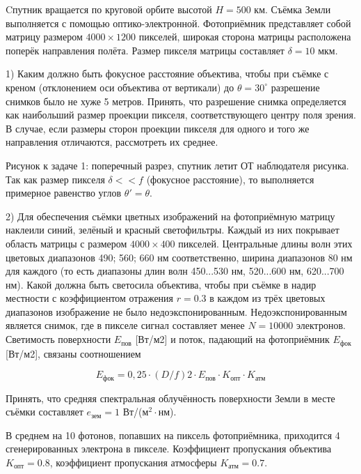 
Cпутник вращается по круговой орбите высотой $H=500$ км. Съёмка Земли выполняется с помощью оптико-электронной. 
Фотоприёмник представляет собой матрицу размером $4000 \times 1200$ пикселей, широкая сторона матрицы 
расположена поперёк направления полёта. Размер пикселя матрицы составляет $\delta=10$ мкм.

1) Каким должно быть фокусное расстояние объектива, чтобы при съёмке с креном (отклонением оси 
объектива от вертикали) до $\theta=30^{\circ}$ разрешение снимков было не хуже 5 метров. Принять, 
что разрешение снимка определяется как наибольший размер проекции пикселя, соответствующего центру поля зрения. 
В случае, если размеры сторон проекции пикселя для одного и того же направления отличаются, рассмотреть их среднее.


Рисунок к задаче 1: поперечный разрез, спутник летит ОТ наблюдателя рисунка. Так как размер пикселя 
$\delta << f$ (фокусное расстояние), то выполняется примерное равенство углов $\theta' = \theta$.

2) Для обеспечения съёмки цветных изображений на фотоприёмную матрицу наклеили синий, зелёный и 
красный светофильтры. Каждый из них покрывает область матрицы с размером $4000 \times 400$ пикселей. Центральные 
длины волн этих цветовых диапазонов 490; 560; 660 нм соответственно, ширина диапазонов 80 нм для каждого 
(то есть диапазоны длин волн 450...530 нм, 520...600 нм, 620...700 нм). Какой должна быть светосила объектива, 
чтобы при съёмке в надир местности с коэффициентом отражения $r = 0.3$ в каждом из трёх цветовых диапазонов 
изображение не было недоэкспонированным. Недоэкспонированным является снимок, где в пикселе сигнал 
составляет менее $N = 10000$ электронов. Светимость поверхности $E_{\text{пов}}$ [Вт/м2] и поток, падающий на 
фотоприёмник $E_{\text{фок}}$ [Вт/м2], связаны соотношением 

$$E_{\text{фок}}=0,25 \cdot (D/f)2 \cdot E_{\text{пов}} \cdot K_{\text{опт}} \cdot K_{\text{атм}}$$

Принять, что средняя спектральная облучённость поверхности Земли в месте съёмки составляет $e_{\text{зем}} = 1$ Вт/(м$^2 \cdot $нм).

В среднем на 10 фотонов, попавших на пиксель фотоприёмника, приходится 4 сгенерированных электрона в 
пикселе. Коэффициент пропускания объектива $K_{\text{опт}} = 0.8$, коэффициент пропускания атмосферы $K_{\text{атм}} = 0.7$.

